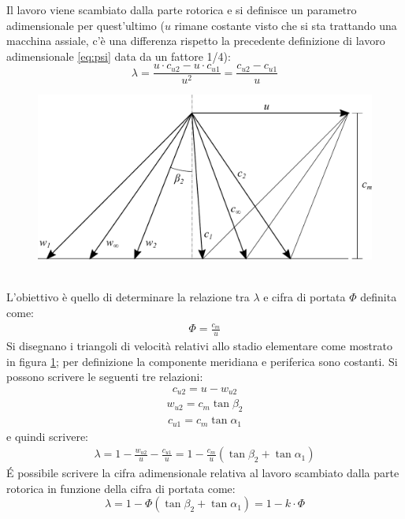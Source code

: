Il lavoro viene scambiato dalla parte rotorica e si definisce un parametro adimensionale per quest'ultimo ($u$ rimane costante visto che si sta trattando una macchina assiale, c'è una differenza rispetto la precedente definizione di lavoro adimensionale \ref{eq:psi} data da un fattore 1/4):
\begin{equation}
\lambda = \frac{u \cdot c_{u2} - u \cdot c_{u1}}{u^2} = \frac{c_{u2} - c_{u1}}{u}
\end{equation}
\begin{figure}[h!]
\centering
  \includegraphics[width=.8\textwidth]{fig/triangComp.pdf}
\caption{}
\label{fig:triangComp}
\end{figure}
\\L'obiettivo è quello di determinare la relazione tra $\lambda$ e cifra di portata $\Phi$ definita come:
\begin{align*}
\Phi = \frac{c_m}{u}
\end{align*}
Si disegnano i triangoli di velocità relativi allo stadio elementare come mostrato in figura \ref{fig:triangComp}; per definizione la componente meridiana e periferica sono costanti. Si possono scrivere le seguenti tre relazioni:
\begin{align*}
c_{u2} = u - w_{u2}
\end{align*}
\begin{align*}
w_{u2} = c_m \tan \beta_2
\end{align*}
\begin{align*}
c_{u1} = c_m \tan \alpha_1
\end{align*}
e quindi scrivere:
\begin{align*}
\lambda = 1- \frac{w_{u2}}{u} - \frac{c_{u1}}{u} = 1 - \frac{c_m}{u} \left(\tan \beta_2 + \tan \alpha_1 \right)
\end{align*}
\'E possibile scrivere la cifra adimensionale relativa al lavoro scambiato dalla parte rotorica in funzione della cifra di portata come:
\begin{equation}
\lambda = 1 - \Phi \left( \tan \beta_2 + \tan \alpha_1 \right) = 1 - k \cdot \Phi
\end{equation}
